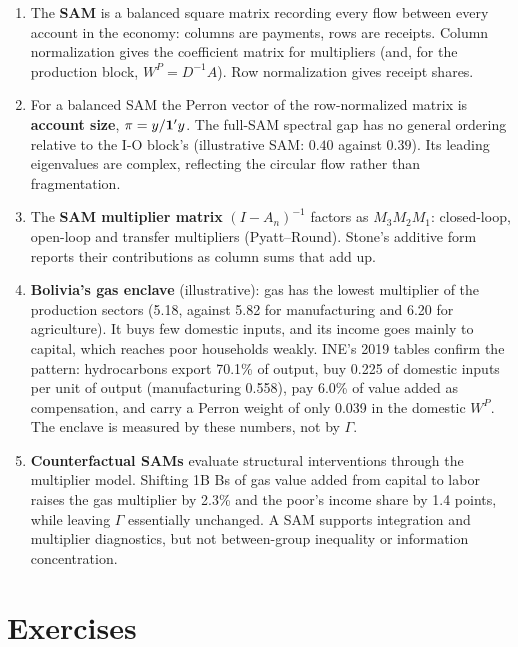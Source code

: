 \documentclass[../structural_economics_book.tex]{subfiles}
\begin{document}
\begin{enumerate}
\item The \textbf{SAM} is a balanced square matrix recording every flow between every account in the economy: columns are payments, rows are receipts. Column normalization gives the coefficient matrix for multipliers (and, for the production block, $W^P = D^{-1}A$). Row normalization gives receipt shares.

\item For a balanced SAM the Perron vector of the row-normalized matrix is \textbf{account size}, $\pi = y/\mathbf{1}'y$. The full-SAM spectral gap has no general ordering relative to the I-O block's (illustrative SAM: $0.40$ against $0.39$). Its leading eigenvalues are complex, reflecting the circular flow rather than fragmentation.

\item The \textbf{SAM multiplier matrix} $(I - A_n)^{-1}$ factors as $M_3M_2M_1$: closed-loop, open-loop and transfer multipliers (Pyatt--Round). Stone's additive form reports their contributions as column sums that add up.

\item \textbf{Bolivia's gas enclave} (illustrative): gas has the lowest multiplier of the production sectors (5.18, against 5.82 for manufacturing and 6.20 for agriculture). It buys few domestic inputs, and its income goes mainly to capital, which reaches poor households weakly. INE's 2019 tables confirm the pattern: hydrocarbons export 70.1\% of output, buy 0.225 of domestic inputs per unit of output (manufacturing 0.558), pay 6.0\% of value added as compensation, and carry a Perron weight of only 0.039 in the domestic $W^P$. The enclave is measured by these numbers, not by $\Gamma$.

\item \textbf{Counterfactual SAMs} evaluate structural interventions through the multiplier model. Shifting 1B Bs of gas value added from capital to labor raises the gas multiplier by 2.3\% and the poor's income share by 1.4 points, while leaving $\Gamma$ essentially unchanged. A SAM supports integration and multiplier diagnostics, but not between-group inequality or information concentration.
\end{enumerate}


\section{Exercises}
\label{ch20:sec:exercises}
\end{document}
